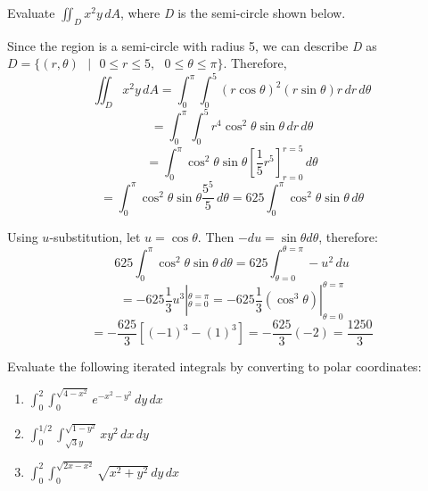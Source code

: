 \begin{Worked}
\begin{Problem}
Evaluate $\iint_{\textit{D}} x^2y\,dA$, where \textit{D} is
the semi-circle shown below. 

\begin{center}
\end{center}
\end{Problem}
\begin{Solution}
Since the region is a semi-circle with radius 5, we can
describe \textit{D} as $\textit{D} = \{(r, \theta)\text{ }|\text{ }0 \leq r 
\leq 5,\text{ }0 \leq \theta \leq \pi\}$. Therefore, 
$$\iint_{\textit{D}} x^2y\,dA = \int_0^{\pi} \int_0^5 \left(r\cos{\theta} 
\right)^2 \left(r \sin{\theta}\right) r\,dr\,d\theta$$
$$= \int_0^{\pi} \int_0^5 r^4 \cos^2{\theta} \sin{\theta}\,dr\,d\theta$$
$$= \int_0^{\pi} \cos^2{\theta} \sin{\theta} \left[ \frac{1}{5}r^5 \right]_{r 
= 0}^{r = 5}\,d\theta$$
$$=\int_0^{\pi} \cos^2{\theta} \sin{\theta} \frac{5^5}{5}\,d\theta = 625 \int_0
^{\pi} \cos^2{\theta}\sin{\theta}\,d\theta$$

Using $u$-substitution, let $u = \cos{\theta}$. Then $-du = \sin{\theta} d
\theta$, therefore:
$$625 \int_0^{\pi} \cos^2{\theta}\sin{\theta}\,d\theta = 625 \int_{\theta = 0}^
{\theta = \pi} -u^2\,du$$
$$= -625 \frac{1}{3}u^3|_{\theta = 0}^{\theta = \pi} = -625 \frac{1}{3} \left( 
\cos^3{\theta} \right)|_{\theta = 0}^{\theta = \pi}$$
$$= -\frac{625}{3} \left[ (-1)^3 - (1)^3 \right] = -\frac{625}{3} \left(-2 
\right) = \frac{1250}{3}$$
\end{Solution}
\end{Worked}

\begin{Exercise}[title = {Changing to Polar Coordinates}, label = polarmulti3]
Evaluate the following iterated integrals by converting to polar coordinates:
\begin{enumerate}
    \item $\int_0^2 \int_0^{\sqrt{4 - x^2}} e^{-x^2 - y^2}\,dy\,dx$
    \item $\int_0^{1/2} \int_{\sqrt{3}y}^{\sqrt{1 - y^2}} xy^2\,dx\,dy$
    \item $\int_0^2 \int_0^{\sqrt{2x - x^2}} \sqrt{x^2 + y^2}\,dy\,dx$
\end{enumerate}
\vspace{130mm}
\end{Exercise}

